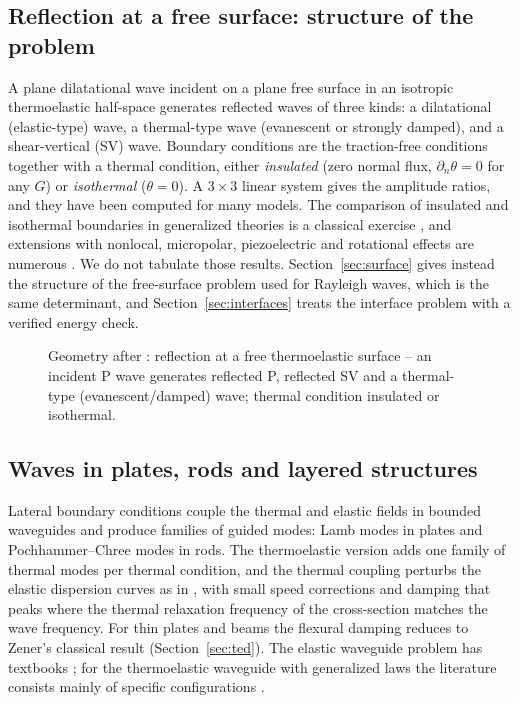 \subsection{Reflection at a free surface: structure of the problem}
A plane dilatational wave incident on a plane free surface in an isotropic thermoelastic half-space generates reflected waves of three kinds: a dilatational (elastic-type) wave, a thermal-type wave (evanescent or strongly damped), and a shear-vertical (SV) wave. Boundary conditions are the traction-free conditions together with a thermal condition, either \emph{insulated} (zero normal flux, $\partial_n\theta=0$ for any $G$) or \emph{isothermal} ($\theta=0$). A $3\times3$ linear system gives the amplitude ratios, and they have been computed for many models. The comparison of insulated and isothermal boundaries in generalized theories is a classical exercise \citep{Das2008}, and extensions with nonlocal, micropolar, piezoelectric and rotational effects are numerous \citep{Kalkal2020,Singh2020b,Yadav2023,Gupta2024a}. We do not tabulate those results. Section~\ref{sec:surface} gives instead the structure of the free-surface problem used for Rayleigh waves, which is the same determinant, and Section~\ref{sec:interfaces} treats the interface problem with a verified energy check.

\begin{figure}[t!]\centering\small

\caption{Geometry after \citep{Das2008}: reflection at a free thermoelastic surface -- an incident P wave generates reflected P, reflected SV and a thermal-type (evanescent/damped) wave; thermal condition insulated or isothermal.}\label{fig:reflection-geo}
\end{figure}

\subsection{Waves in plates, rods and layered structures}
Lateral boundary conditions couple the thermal and elastic fields in bounded waveguides and produce families of guided modes: Lamb modes in plates \citep{Lamb1917} and Pochhammer--Chree modes in rods. The thermoelastic version adds one family of thermal modes per thermal condition, and the thermal coupling perturbs the elastic dispersion curves as in , with small speed corrections and damping that peaks where the thermal relaxation frequency of the cross-section matches the wave frequency. For thin plates and beams the flexural damping reduces to Zener's classical result (Section~\ref{sec:ted}). The elastic waveguide problem has textbooks \citep{Achenbach1973,Auld1973}; for the thermoelastic waveguide with generalized laws the literature consists mainly of specific configurations \citep{Biswas2020,Abouelregal2023}.

